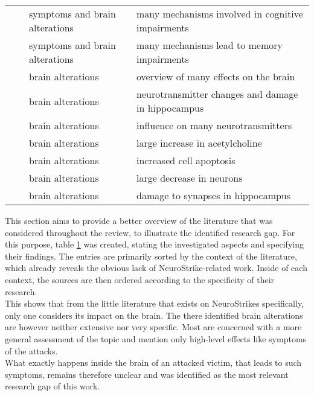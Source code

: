 \begin{table}[htbp]
\begin{tabular}{@{}p{2.9cm} p{2.5cm} p{4cm} p{5cm}@{}}
                & \small{\textcite{Zhi.2017}} & \small{symptoms and brain \newline alterations} & \small{many mechanisms involved in cognitive impairments} \\ 
                & \small{\textcite{Tan.2017}} & \small{symptoms and brain \newline alterations} & \small{many mechanisms lead to memory impairments} \\ 
                & \small{\textcite{Lai.1994}} & \small{brain alterations} & \small{overview of many effects on the brain} \\
                & \small{\textcite{Lin.2021}} & \small{brain alterations} & \small{neurotransmitter changes and damage in hippocampus} \\
                & \small{\textcite{Hu.2021}} & \small{brain alterations} & \small{influence on many neurotransmitters} \\
                & \small{\textcite{Fujiwara.1978}} & \small{brain alterations} & \small{large increase in acetylcholine} \\
                & \small{\textcite{Shahin.2015}} & \small{brain alterations} & \small{increased cell apoptosis} \\ 
                & \small{\textcite{Altun.2017}} & \small{brain alterations} & \small{large decrease in neurons} \\ 
                & \small{\textcite{Xu.2006}} & \small{brain alterations} & \small{damage to synapses in \newline hippocampus} \\ 
            \bottomrule
        \end{tabular}
        \label{tab:neurostrike-literature}
    \end{table}
    This section aims to provide a better overview of the literature that was considered throughout the review, to illustrate the identified research gap. For this purpose, table \ref{tab:neurostrike-literature} was created, stating the investigated aspects and specifying their findings. The entries are primarily sorted by the context of the literature, which already reveals the obvious lack of NeuroStrike-related work. Inside of each context, the sources are then ordered according to the specificity of their research.\\
    This shows that from the little literature that exists on NeuroStrikes specifically, only one considers its impact on the brain. The there identified brain alterations are however neither extensive nor very specific. Most are concerned with a more general assessment of the topic and mention only high-level effects like symptoms of the attacks.\\
    What exactly happens inside the brain of an attacked victim, that leads to such symptoms, remains therefore unclear and was identified as the most relevant research gap of this work.


